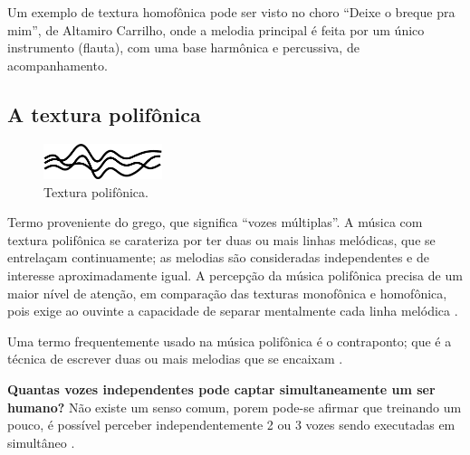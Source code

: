 \begin{example}
Um exemplo de textura homofônica pode ser visto no choro ``Deixe o breque pra mim'',
de Altamiro Carrilho, 
onde a melodia principal é feita por um único instrumento (flauta), 
com uma base harmônica e percussiva, de acompanhamento.
\end{example}



\subsection{A textura polifônica}
\label{subsec:polifonica}
\begin{figure}
\centering
    \includegraphics[width=0.31\textwidth]{chapters/cap-musicalidade-percepcion/polifonica1.eps}
  \caption{Textura polifônica.}
\end{figure}
Termo proveniente do grego, que significa ``vozes múltiplas''.%
A música com textura polifônica se carateriza por ter duas ou mais linhas melódicas, 
que se entrelaçam continuamente;
as melodias são consideradas independentes e de interesse aproximadamente igual.
A percepção da música polifônica precisa de um maior nível de atenção, 
em comparação das texturas monofônica e homofônica,
pois exige ao ouvinte a capacidade de separar mentalmente cada linha melódica  
\cite[pp. 79-80]{copland1974ouvir} \cite[pp. 29]{kerman2015listen} 
\cite[pp. 42]{bennett1993elementos} \cite[pp. 59]{holland2013music}
\cite[pp. 687]{apel1969harvard}.

Uma termo frequentemente usado na música polifônica é o contraponto;
que é a técnica de escrever duas ou mais melodias que se encaixam 
\cite[pp. 29]{kerman2015listen} \cite[pp. 42]{bennett1993elementos}.

\begin{tcbinformation} 
\label{ref:quantasvozes}
\textbf{Quantas vozes independentes pode captar simultaneamente um ser humano?}
Não existe um senso comum, porem pode-se afirmar que treinando um pouco,
é possível perceber independentemente 2 ou 3 vozes sendo executadas em simultâneo \cite[pp. 81]{copland1974ouvir}. 
\end{tcbinformation} 

